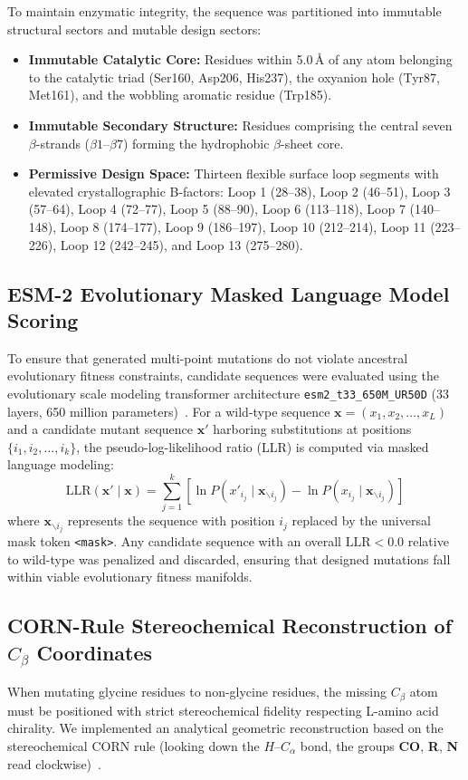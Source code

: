 \documentclass[10pt,twocolumn,a4paper]{article}
\begin{document}
To maintain enzymatic integrity, the sequence was partitioned into immutable structural sectors and mutable design sectors:
\begin{itemize}
    \item \textbf{Immutable Catalytic Core:} Residues within 5.0\,\AA{} of any atom belonging to the catalytic triad (Ser160, Asp206, His237), the oxyanion hole (Tyr87, Met161), and the wobbling aromatic residue (Trp185).
    \item \textbf{Immutable Secondary Structure:} Residues comprising the central seven $\beta$-strands ($\beta1\text{--}\beta7$) forming the hydrophobic $\beta$-sheet core.
    \item \textbf{Permissive Design Space:} Thirteen flexible surface loop segments with elevated crystallographic B-factors: Loop 1 (28–38), Loop 2 (46–51), Loop 3 (57–64), Loop 4 (72–77), Loop 5 (88–90), Loop 6 (113–118), Loop 7 (140–148), Loop 8 (174–177), Loop 9 (186–197), Loop 10 (212–214), Loop 11 (223–226), Loop 12 (242–245), and Loop 13 (275–280).
\end{itemize}

\subsection{ESM-2 Evolutionary Masked Language Model Scoring}
To ensure that generated multi-point mutations do not violate ancestral evolutionary fitness constraints, candidate sequences were evaluated using the evolutionary scale modeling transformer architecture \texttt{esm2\_t33\_650M\_UR50D} (33 layers, 650 million parameters)~\cite{Lin2023}. For a wild-type sequence $\mathbf{x} = (x_1, x_2, \dots, x_L)$ and a candidate mutant sequence $\mathbf{x}'$ harboring substitutions at positions $\{i_1, i_2, \dots, i_k\}$, the pseudo-log-likelihood ratio (LLR) is computed via masked language modeling:
\begin{equation}
\text{LLR}(\mathbf{x}' \mid \mathbf{x}) = \sum_{j=1}^k \left[ \ln P(x'_{i_j} \mid \mathbf{x}_{\backslash i_j}) - \ln P(x_{i_j} \mid \mathbf{x}_{\backslash i_j}) \right]
\label{eq:llr}
\end{equation}
where $\mathbf{x}_{\backslash i_j}$ represents the sequence with position $i_j$ replaced by the universal mask token \texttt{<mask>}. Any candidate sequence with an overall $\text{LLR} < 0.0$ relative to wild-type was penalized and discarded, ensuring that designed mutations fall within viable evolutionary fitness manifolds.

\subsection{CORN-Rule Stereochemical Reconstruction of $C_\beta$ Coordinates}
When mutating glycine residues to non-glycine residues, the missing $C_\beta$ atom must be positioned with strict stereochemical fidelity respecting L-amino acid chirality. We implemented an analytical geometric reconstruction based on the stereochemical CORN rule (looking down the $H\text{--}C_\alpha$ bond, the groups \textbf{CO}, \textbf{R}, \textbf{N} read clockwise)~\cite{Engh1991}.
\end{document}
